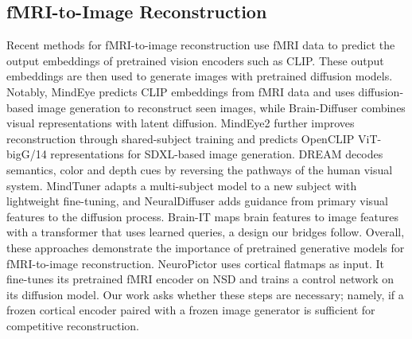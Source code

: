 \documentclass[letterpaper]{article} %
\begin{document}
\subsection{fMRI-to-Image Reconstruction}
Recent methods for fMRI-to-image reconstruction use fMRI data to predict the output embeddings of pretrained vision encoders such as CLIP. These output embeddings are then used to generate images with pretrained diffusion models. Notably, MindEye \cite{scotti2023reconstructingmindseyefmritoimage} predicts CLIP embeddings from fMRI data and uses diffusion-based image generation to reconstruct seen images, while Brain-Diffuser \cite{ozcelik2023brain} combines visual representations with latent diffusion. MindEye2 further improves reconstruction through shared-subject training and predicts OpenCLIP ViT-bigG/14 representations \cite{schuhmann2022laionb, ilharco_gabriel_2021_5143773} for SDXL-based image generation. DREAM \cite{xia2024dreamvisualdecodingreversing} decodes semantics, color and depth cues by reversing the pathways of the human visual system. MindTuner \cite{gong2024mindtunercrosssubjectvisualdecoding} adapts a multi-subject model to a new subject with lightweight fine-tuning, and NeuralDiffuser \cite{Li_2025} adds guidance from primary visual features to the diffusion process. Brain-IT \cite{beliy2025brainitimagereconstructionfmri} maps brain features to image features with a transformer that uses learned queries, a design our bridges follow. Overall, these approaches demonstrate the importance of pretrained generative models for fMRI-to-image reconstruction. NeuroPictor \cite{huo2024neuropictorrefiningfmritoimagereconstruction} uses cortical flatmaps as input. It fine-tunes its pretrained fMRI encoder on NSD and trains a control network on its diffusion model. Our work asks whether these steps are necessary; namely, if a frozen cortical encoder paired with a frozen image generator is sufficient for competitive reconstruction.
\end{document}
